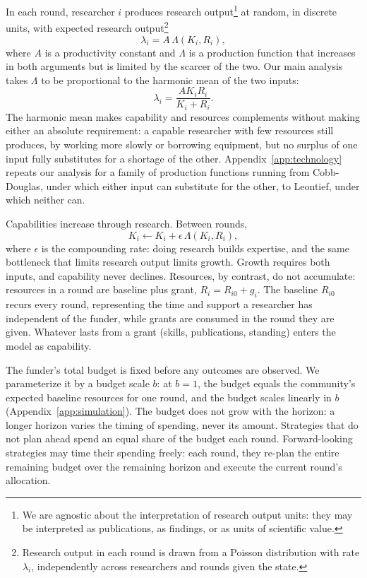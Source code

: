 \documentclass[article, 11pt, reqno]{amsart}
\theoremstyle{named}
\begin{document}
In each round, researcher $i$ produces research output\footnote{We are agnostic about the interpretation of research output units: they may be interpreted as publications, as findings, or as units of scientific value.} at random, in discrete units, with expected research output\footnote{Research output in each round is drawn from a Poisson distribution with rate $\lambda_i$, independently across researchers and rounds given the state.}
\[
\lambda_i = A\,\Lambda(K_i, R_i),
\]
where $A$ is a productivity constant and $\Lambda$ is a production function that increases in both arguments but is limited by the scarcer of the two. Our main analysis takes $\Lambda$ to be proportional to the harmonic mean of the two inputs:
\[
\lambda_i = \frac{A K_i R_i}{K_i + R_i}.
\]
The harmonic mean makes capability and resources complements without making either an absolute requirement: a capable researcher with few resources still produces, by working more slowly or borrowing equipment, but no surplus of one input fully substitutes for a shortage of the other. Appendix~\ref{app:technology} repeats our analysis for a family of production functions running from Cobb-Douglas, under which either input can substitute for the other, to Leontief, under which neither can.

Capabilities increase through research. Between rounds,
\[
K_i \leftarrow K_i + \epsilon\,\Lambda(K_i, R_i),
\]
where $\epsilon$ is the compounding rate: doing research builds expertise, and the same bottleneck that limits research output limits growth. Growth requires both inputs, and capability never declines. Resources, by contrast, do not accumulate: resources in a round are baseline plus grant, $R_i = R_{i0} + g_i$. The baseline $R_{i0}$ recurs every round, representing the time and support a researcher has independent of the funder, while grants are consumed in the round they are given. Whatever lasts from a grant (skills, publications, standing) enters the model as capability.

The funder's total budget is fixed before any outcomes are observed. We parameterize it by a budget scale $b$: at $b = 1$, the budget equals the community's expected baseline resources for one round, and the budget scales linearly in $b$ (Appendix~\ref{app:simulation}). The budget does not grow with the horizon: a longer horizon varies the timing of spending, never its amount. Strategies that do not plan ahead spend an equal share of the budget each round. Forward-looking strategies may time their spending freely: each round, they re-plan the entire remaining budget over the remaining horizon and execute the current round's allocation.
\end{document}
